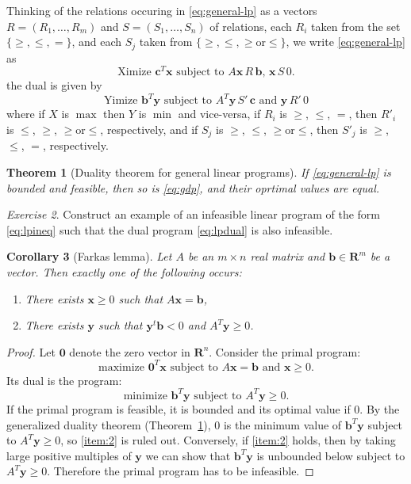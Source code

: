 \documentclass{amsbook}
\newcommand{\xx}{\mathbf x}
\newcommand{\yy}{\mathbf y}
\newcommand{\cc}{\mathbf c}
\newcommand{\bb}{\mathbf b}
\newcommand{\RR}{\mathbf R}
\newtheorem{theorem}{Theorem}[section]
\newtheorem{corollary}[theorem]{Corollary}
\theoremstyle{definition}
\theoremstyle{remark}
\newtheorem{exercise}[theorem]{Exercise}
\begin{document}
Thinking of the relations occuring in \eqref{eq:general-lp} as a vectors $R=(R_1,\dotsc,R_m)$ and $S=(S_1,\dotsc,S_n)$ of relations, each $R_i$ taken from the set $\{\geq,\leq,=\}$, and each $S_j$ taken from $\{\geq,\leq,\geq\text{or}\leq\}$, we write \eqref{eq:general-lp} as
\begin{equation}
  \tag{GLP}
  \text{Ximize $\cc^T\xx$ subject to $A\xx \,R\, \bb$, $\xx \,S\,0$}.
\end{equation}
the dual is given by
\begin{equation}
  \label{eq:gdp}
  \tag{GDP}
  \text{Yimize $\bb^T\yy$ subject to $A^T\yy\, S'\, \cc$ and $\yy\, R'\, 0$}
\end{equation}
where if $X$ is $\max$ then $Y$ is $\min$ and vice-versa, if $R_i$ is $\geq$, $\leq$, $=$, then $R'_i$ is $\leq$, $\geq$, $\geq\text{or}\leq$, respectively, and if $S_j$ is $\geq$, $\leq$, $\geq\text{or}\leq$, then $S'_j$ is $\geq$, $\leq$, $=$, respectively.
\begin{theorem}
  [Duality theorem for general linear programs]
  \label{theorem:gen-dual}
  If \eqref{eq:general-lp} is bounded and feasible, then so is \eqref{eq:gdp}, and their oprtimal values are equal.
\end{theorem}
\begin{exercise}
  Construct an example of an infeasible linear program of the form \eqref{eq:lpineq} such that the dual program \eqref{eq:lpdual} is also infeasible.
\end{exercise}
\begin{corollary}
  [Farkas lemma]
  Let $A$ be an $m\times n$ real matrix and $\bb\in \RR^m$ be a vector.
  Then exactly one of the following occurs:
  \begin{enumerate}
  \item \label{item:1} There exists $\xx\geq 0$ such that $A\xx=\bb$,
  \item \label{item:2} There exists $\yy$ such that $\yy^t\bb<0$ and $A^T\yy\geq 0$.
  \end{enumerate}
\end{corollary}
\begin{proof}
  Let $\mathbf 0$ denote the zero vector in $\RR^n$.
  Consider the primal program:
  \begin{displaymath}
    \text{maximize $\mathbf 0^T\xx$ subject to $A\xx=\bb$ and $\xx\geq 0$}.
  \end{displaymath}
  Its dual is the program:
  \begin{displaymath}
    \text{minimize $\bb^T\yy$ subject to $A^T\yy\geq 0$.}
  \end{displaymath}
  If the primal program is feasible, it is bounded and its optimal value if $0$.
  By the generalized duality theorem (Theorem~\ref{theorem:gen-dual}), $0$ is the minimum value of $\bb^T\yy$ subject to $A^T\yy\geq 0$, so \eqref{item:2} is ruled out.
  Conversely, if \eqref{item:2} holds, then by taking large positive multiples of $\yy$ we can show that $\bb^T\yy$ is unbounded below subject to $A^T\yy\geq 0$.
  Therefore the primal program has to be infeasible.
\end{proof}
\end{document}
